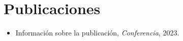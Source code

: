 \documentclass[a4paper, 11pt]{article}
\begin{document}
\section{Publicaciones}
\begin{itemize}
	\item Información sobre la publicación, \emph{Conferencia}, 2023.
\end{itemize}




%
\end{document}
